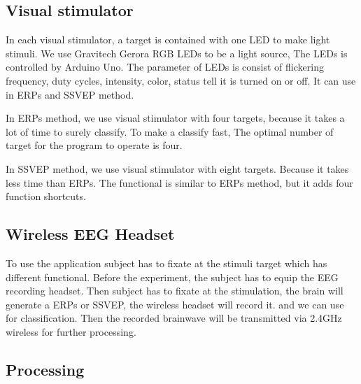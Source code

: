 \subsection{Visual stimulator}

In each visual stimulator, a target is contained with one LED to make light stimuli. We use Gravitech Gerora RGB LEDs to be a light source, The LEDs is controlled by Arduino Uno.  The parameter of LEDs is consist of flickering frequency, duty cycles, intensity, color, status tell it is turned on or off. It can use in ERPs and SSVEP method. 

In ERPs method, we use visual stimulator with four targets, because it takes a lot of time to surely classify. To make a classify fast, The optimal number of target for the program to operate is four.

In SSVEP method, we use visual stimulator with eight targets. Because it takes less time than ERPs. The functional is similar to ERPs method, but it adds four function shortcuts.

\subsection{Wireless EEG Headset}
To use the application subject has to fixate at the stimuli target which has different functional. Before the experiment, the subject has to equip the EEG recording headset. Then subject has to fixate at the stimulation, the brain will generate a ERPs or SSVEP, the wireless headset will record it. and we can use for classification. Then the recorded brainwave will be transmitted via 2.4GHz wireless for further processing.

\subsection{Processing}



\newpage
